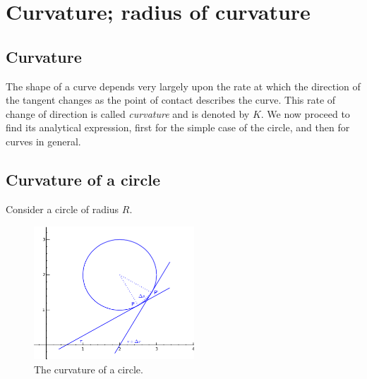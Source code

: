 
\chapter{Curvature; radius of curvature}


\section{Curvature}


The shape of a curve depends very largely upon the 
rate at which the direction of the tangent changes as the 
point of contact describes the curve. This rate of change 
of direction is called {\it curvature} and is denoted by $K$. 
We now proceed to find its analytical expression, first 
for the simple case of the circle, and then for curves in general.

\section{Curvature of a circle}

Consider a circle of radius $R$. 

\begin{figure}[h!]
\begin{minipage}{\textwidth}
\begin{center}
\includegraphics[height=5cm,width=6cm]{curvature-circle2.eps}
\end{center}
\end{minipage}
\caption{The curvature of a circle.}
\label{fig:curvature-circle}
\end{figure}


